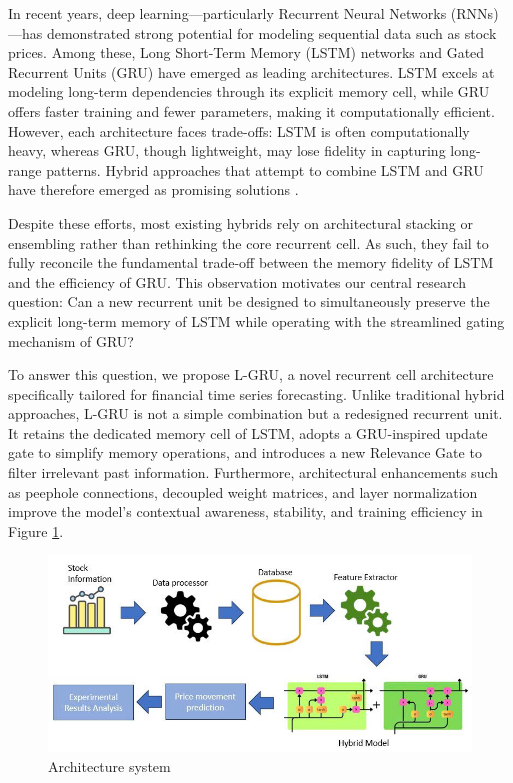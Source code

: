 \documentclass{cys}
\begin{document}
In recent years, deep learning—particularly Recurrent Neural Networks (RNNs)—has demonstrated strong potential for modeling sequential data such as stock prices. Among these, Long Short-Term Memory (LSTM) networks and Gated Recurrent Units (GRU) have emerged as leading architectures. LSTM excels at modeling long-term dependencies through its explicit memory cell, while GRU offers faster training and fewer parameters, making it computationally efficient. However, each architecture faces trade-offs: LSTM is often computationally heavy, whereas GRU, though lightweight, may lose fidelity in capturing long-range patterns. Hybrid approaches that attempt to combine LSTM and GRU have therefore emerged as promising solutions \cite{alomar2024rnns, bhavani2022comparative, karim2022stock, chavhan2024deep}.

Despite these efforts, most existing hybrids rely on architectural stacking or ensembling rather than rethinking the core recurrent cell. As such, they fail to fully reconcile the fundamental trade-off between the memory fidelity of LSTM and the efficiency of GRU. This observation motivates our central research question: Can a new recurrent unit be designed to simultaneously preserve the explicit long-term memory of LSTM while operating with the streamlined gating mechanism of GRU?

To answer this question, we propose L-GRU, a novel recurrent cell architecture specifically tailored for financial time series forecasting. Unlike traditional hybrid approaches, L-GRU is not a simple combination but a redesigned recurrent unit. It retains the dedicated memory cell of LSTM, adopts a GRU-inspired update gate to simplify memory operations, and introduces a new Relevance Gate to filter irrelevant past information. Furthermore, architectural enhancements such as peephole connections, decoupled weight matrices, and layer normalization improve the model’s contextual awareness, stability, and training efficiency in Figure \ref{fig:placeholder}.

\begin{figure}
    \centering
    \includegraphics[width=\linewidth]{Figure/sysytem.PNG}
    \caption{Architecture system}
    \label{fig:placeholder}
\end{figure}
\end{document}
